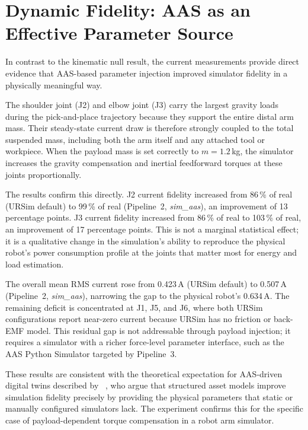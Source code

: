 \section{Dynamic Fidelity: AAS as an Effective Parameter Source}
\label{sec:discussion_dynamics}

In contrast to the kinematic null result, the current measurements provide direct evidence that
AAS-based parameter injection improved simulator fidelity in a physically meaningful way.

The shoulder joint (J2) and elbow joint (J3) carry the largest gravity loads during the
pick-and-place trajectory because they support the entire distal arm mass.
Their steady-state current draw is therefore strongly coupled to the total suspended mass,
including both the arm itself and any attached tool or workpiece.
When the payload mass is set correctly to $m = 1.2$\,kg, the simulator increases the gravity
compensation and inertial feedforward torques at these joints proportionally.

The results confirm this directly.
J2 current fidelity increased from 86\,\% of real (URSim default) to 99\,\% of real
(Pipeline~2, \textit{sim\_aas}), an improvement of 13 percentage points.
J3 current fidelity increased from 86\,\% of real to 103\,\% of real, an improvement of
17 percentage points.
This is not a marginal statistical effect; it is a qualitative change in the simulation's
ability to reproduce the physical robot's power consumption profile at the joints that matter
most for energy and load estimation.

The overall mean RMS current rose from 0.423\,A (URSim default) to 0.507\,A
(Pipeline~2, \textit{sim\_aas}), narrowing the gap to the physical robot's 0.634\,A.
The remaining deficit is concentrated at J1, J5, and J6, where both URSim configurations report
near-zero current because URSim has no friction or back-EMF model.
This residual gap is not addressable through payload injection; it requires a simulator with a
richer force-level parameter interface, such as the AAS Python Simulator targeted by
Pipeline~3.

These results are consistent with the theoretical expectation for AAS-driven digital twins
described by \citeauthor{Heppner2023}~\cite{Heppner2023}, who argue that structured asset
models improve simulation fidelity precisely by providing the physical parameters that static
or manually configured simulators lack.
The experiment confirms this for the specific case of payload-dependent torque compensation in
a robot arm simulator.


